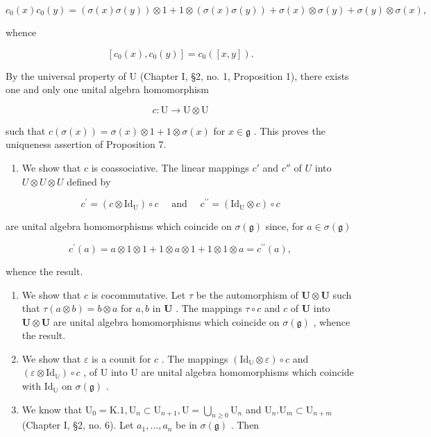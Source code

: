 \[
c _ {0} (x) c _ {0} (y) = (\sigma (x) \sigma (y)) \otimes 1 + 1 \otimes (\sigma (x) \sigma (y)) + \sigma (x) \otimes \sigma (y) + \sigma (y) \otimes \sigma (x),
\]

whence

\[
[ c _ {0} (x), c _ {0} (y) ] = c _ {0} ([ x, y ]).
\]

By the universal property of U (Chapter I, §2, no. 1, Proposition 1), there exists one and only one unital algebra homomorphism

\[
c \colon \mathrm{U} \to \mathrm{U} \otimes \mathrm{U}
\]

such that \(c(\sigma(x)) = \sigma(x) \otimes 1 + 1 \otimes \sigma(x)\) for \(x \in \mathfrak{g}\) . This proves the uniqueness assertion of Proposition 7.

\begin{enumerate}
\def\labelenumi{(\alph{enumi})}
\setcounter{enumi}{1}
\tightlist
\item
  We show that \(c\) is coassociative. The linear mappings \(c'\) and \(c''\) of \(U\) into \(U \otimes U \otimes U\) defined by
\end{enumerate}

\[
c ^ {\prime} = (c \otimes \mathrm{Id} _ {\mathrm{U}}) \circ c \quad \text { and } \quad c ^ {\prime \prime} = (\mathrm{Id} _ {\mathrm{U}} \otimes c) \circ c
\]

are unital algebra homomorphisms which coincide on \(\sigma (\mathfrak{g})\) since, for \(a\in \sigma (\mathfrak{g})\)

\[
c ^ {\prime} (a) = a \otimes 1 \otimes 1 + 1 \otimes a \otimes 1 + 1 \otimes 1 \otimes a = c ^ {\prime \prime} (a),
\]

whence the result.

\begin{enumerate}
\def\labelenumi{(\alph{enumi})}
\setcounter{enumi}{2}
\item
  We show that \(c\) is cocommutative. Let \(\tau\) be the automorphism of \(\mathbf{U} \otimes \mathbf{U}\) such that \(\tau(a \otimes b) = b \otimes a\) for \(a, b\) in \(\mathbf{U}\) . The mappings \(\tau \circ c\) and \(c\) of \(\mathbf{U}\) into \(\mathbf{U} \otimes \mathbf{U}\) are unital algebra homomorphisms which coincide on \(\sigma(\mathfrak{g})\) , whence the result.
\item
  We show that \(\varepsilon\) is a counit for \(c\) . The mappings \((\mathrm{Id}_{\mathbb{U}} \otimes \varepsilon) \circ c\) and \((\varepsilon \otimes \mathrm{Id}_{\mathbb{U}}) \circ c\) , of U into U are unital algebra homomorphisms which coincide with \(\mathrm{Id}_{\mathbb{U}}\) on \(\sigma(\mathfrak{g})\) .
\item
  We know that \(\mathrm{U}_0 = \mathrm{K}.1, \mathrm{U}_n \subset \mathrm{U}_{n+1}, \mathrm{U} = \bigcup_{n \geqslant 0} \mathrm{U}_n\) and \(\mathrm{U}_n. \mathrm{U}_m \subset \mathrm{U}_{n+m}\) (Chapter I, §2, no. 6). Let \(a_1, \ldots, a_n\) be in \(\sigma(\mathfrak{g})\) . Then
\end{enumerate}

